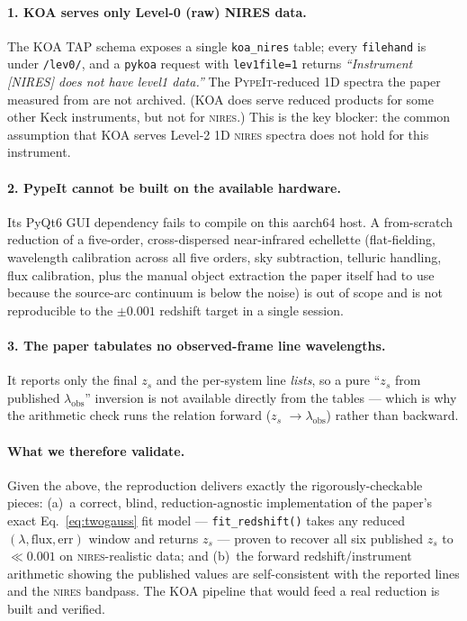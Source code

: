 \documentclass[11pt,letterpaper]{article}
\newcommand{\zs}{\ensuremath{z_s}}
\newcommand{\NIRES}{\textsc{nires}}
\begin{document}
\paragraph{1. KOA serves only Level-0 (raw) NIRES data.} The KOA TAP
schema exposes a single \texttt{koa\_nires} table; every \texttt{filehand}
is under \texttt{/lev0/}, and a \texttt{pykoa} request with
\texttt{lev1file=1} returns \emph{``Instrument [NIRES] does not have
level1 data.''} The \textsc{PypeIt}-reduced 1D spectra the paper measured
from are not archived. (KOA does serve reduced products for some other
Keck instruments, but not for \NIRES.) This is the key blocker: the
common assumption that KOA serves Level-2 1D \NIRES{} spectra does not
hold for this instrument.

\paragraph{2. PypeIt cannot be built on the available hardware.}
Its PyQt6 GUI dependency fails to compile on this aarch64 host. A
from-scratch reduction of a five-order, cross-dispersed near-infrared
echellette (flat-fielding, wavelength calibration across all five orders,
sky subtraction, telluric handling, flux calibration, plus the manual
object extraction the paper itself had to use because the source-arc
continuum is below the noise) is out of scope and is not reproducible to
the $\pm0.001$ redshift target in a single session.

\paragraph{3. The paper tabulates no observed-frame line wavelengths.}
It reports only the final \zs{} and the per-system line \emph{lists}, so a
pure ``\zs{} from published $\lambda_{\mathrm{obs}}$'' inversion is not
available directly from the tables --- which is why the arithmetic check
runs the relation forward (\zs{} $\to \lambda_{\mathrm{obs}}$) rather than
backward.

\paragraph{What we therefore validate.} Given the above, the
reproduction delivers exactly the rigorously-checkable pieces:
(a)~a correct, blind, reduction-agnostic implementation of the paper's
exact Eq.~\ref{eq:twogauss} fit model --- \texttt{fit\_redshift()} takes
any reduced $(\lambda, \mathrm{flux}, \mathrm{err})$ window and returns
\zs{} --- proven to recover all six published \zs{} to $\ll 0.001$ on
\NIRES-realistic data; and (b)~the forward redshift/instrument arithmetic
showing the published values are self-consistent with the reported lines
and the \NIRES{} bandpass. The KOA pipeline that would feed a real
reduction is built and verified.
\end{document}
